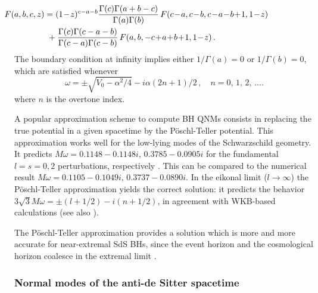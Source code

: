 \documentclass[]{iopart}
\def\be{\begin{equation}}
\def\ee{\end{equation}}
\begin{document}
%
\begin{eqnarray}
& \hspace{-2cm} F(a,b,c,z)= (1\!-\!z)^{c-a-b}
\frac{\Gamma(c)\Gamma(a+b-c)}{\Gamma(a)\Gamma(b)}
 \,F(c\!-\!a,c\!-\!b,c\!-\!a\!-\!b\!+\!1,1\!-\!z) & \nonumber \\
&  \hspace{-0.2cm}+
\frac{\Gamma(c)\Gamma(c-a-b)}{\Gamma(c-a)\Gamma(c-b)}
 \,F(a,b,-c\!+\!a\!+\!b\!+\!1,1\!-\!z)\,.
 \label{transformation law}
\end{eqnarray}
%
The boundary condition at infinity implies either $1/\Gamma(a)=0$ or
$1/\Gamma(b)=0$, which are satisfied whenever
%
\be 
\omega=\pm \sqrt{V_0-\alpha^2/4}-i\alpha(2n+1)/2\,,\quad n=0,\,1,\,2,\,....
\ee
%
where $n$ is the overtone index.

A popular approximation scheme to compute BH QNMs consists in replacing the
true potential in a given spacetime by the P\"oschl-Teller potential.  This
approximation works well for the low-lying modes of the Schwarzschild
geometry. It predicts $M\omega=0.1148-0.1148i,\,0.3785-0.0905i$ for the
fundamental $l=s=0,2$ perturbations, respectively \cite{Ferrari:1984zz}. This
can be compared to the numerical result
\cite{Leaver:1985ax,Berti:2005ys,rdweb} $M
\omega=0.1105-0.1049i,\,0.3737-0.0890i$.  In the eikonal limit ($l\rightarrow
\infty$) the P\"oschl-Teller approximation yields the correct solution: it
predicts the behavior $3\sqrt{3}M\omega=\pm (l+1/2)-i(n+1/2)$, in agreement
with WKB-based calculations \cite{pressringdown,Iyer:1986np,Iyer:1986nq} (see
also \cite{barretozworski}).

The P\"oschl-Teller approximation provides a solution which is more and more
accurate for near-extremal SdS BHs, since the event horizon and the
cosmological horizon coalesce in the extremal limit
\cite{Moss:2001ga,Cardoso:2003sw,LopezOrtega:2007sr}.
\subsubsection*{Normal modes of the anti-de Sitter spacetime}
\end{document}
